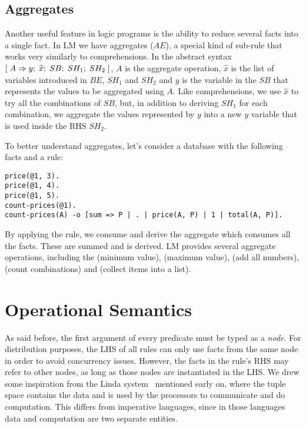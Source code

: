 \subsection{Aggregates}

Another useful feature in logic programs is the ability to reduce several facts
into a single fact.  In LM we have aggregates ($AE$), a special kind of sub-rule
that works very similarly to comprehensions.  In the abstract syntax
$[\; A \Rightarrow y; \; \widehat{x}; \; SB; \; SH_1; \; SH_2 \;]$, $A$ is the aggregate operation,
$\widehat{x}$ is the list of variables introduced in $BE$, $SH_1$ and $SH_2$
and $y$ is the variable in the $SB$ that represents the values to be
aggregated using $A$. Like comprehensions, we use $\widehat{x}$ to try all
the combinations of $SB$, but, in addition to deriving $SH_1$ for each
combination, we aggregate the values represented by $y$ into a new $y$
variable that is used inside the RHS $SH_2$.

To better understand aggregates, let's consider a database with the following
facts and a rule:

\begin{Verbatim}[fontsize=\codesize]
price(@1, 3).
price(@1, 4).
price(@1, 5).
count-prices(@1).
count-prices(A) -o [sum => P | . | price(A, P) | 1 | total(A, P)].
\end{Verbatim}

By applying the rule, we consume  and derive the
aggregate which consumes all the  facts.  These are summed
and  is derived. LM provides several aggregate operations,
including the  (minimum value),  (maximum value),
 (add all numbers),  (count combinations) and
 (collect items into a list).

\section{Operational Semantics}

As said before, the first argument of every predicate must be typed as a
\emph{node}.  For distribution purposes, the LHS of all rules can only use facts
from the same node in order to avoid concurrency issues. However, the facts in
the rule's RHS may refer to other nodes, as long as those nodes are instantiated
in the LHS. We drew some inspiration from the Linda system~\cite{linda}
mentioned early on, where the tuple space contains the data and is used by the
processors to communicate and do computation.  This differs from imperative
languages, since in those languages data and computation are two separate
entities.

